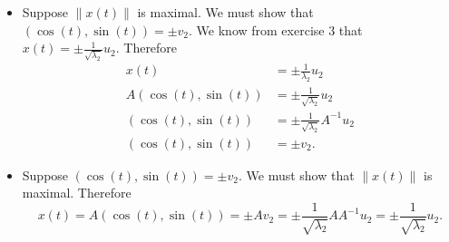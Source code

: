\documentclass[12pt, letterpaper]{article}
\begin{document}
\begin{enumerate}
\begin{itemize}
			\begin{itemize}
				\item Suppose $\|x(t)\|$ is maximal.  We must show that $(\cos(t), \sin(t)) = \pm v_2$.  We know from exercise 3 that $x(t) = \pm \frac{1}{\sqrt{\lambda_2}} u_2$.  Therefore 
				\begin{align*}
				x(t) &= \pm \frac{1}{\lambda_2} u_2\\
				A(\cos(t),\sin(t)) &= \pm \frac{1}{\sqrt{\lambda_2}} u_2\\
				(\cos(t),\sin(t)) &= \pm \frac{1}{\sqrt{\lambda_2}} A^{-1} u_2\\
				(\cos(t),\sin(t)) &= \pm v_2.
				\end{align*}
				\item Suppose $(\cos(t), \sin(t)) = \pm v_2$.  We must show that $\|x(t)\|$ is maximal.  
				Therefore 
				$$
				x(t) = A(\cos(t), \sin(t)) = \pm A v_2 = \pm \frac{1}{\sqrt{\lambda_2}} A A^{-1} u_2 = \pm \frac{1}{\sqrt{\lambda_2}} u_2.
				$$
				

\end{itemize}
\end{itemize}
\end{enumerate}
\end{document}
